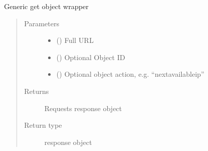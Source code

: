 \documentclass[letterpaper,10pt,english]{sphinxmanual}
\begin{document}
\begin{fulllineitems}
\begin{fulllineitems}
\end{fulllineitems}


\begin{fulllineitems}
\label{\detokenize{code:bloxone.bloxone.b1.get}}
\sphinxAtStartPar
Generic get object wrapper
\begin{quote}\begin{description}
\item[{Parameters}] \leavevmode\begin{itemize}
\item {} 
\sphinxAtStartPar
{} () \textendash{} Full URL

\item {} 
\sphinxAtStartPar
{} () \textendash{} Optional Object ID

\item {} 
\sphinxAtStartPar
{} () \textendash{} Optional object action, e.g. “nextavailableip”

\end{itemize}

\item[{Returns}] \leavevmode
\sphinxAtStartPar
Requests response object

\item[{Return type}] \leavevmode
\sphinxAtStartPar
response object

\end{description}\end{quote}

\end{fulllineitems}



\end{fulllineitems}
\end{document}
